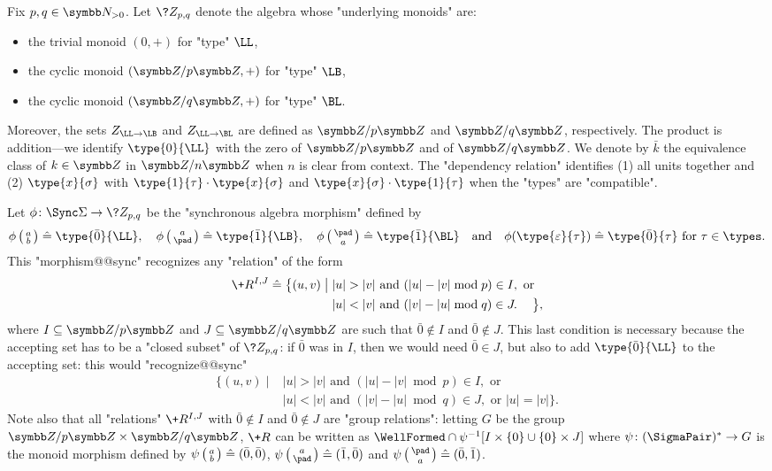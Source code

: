 \begin{example}
	\AP\label{ex:algebra-Zpq}
	Fix $p,q \in \N_{>0}$. Let $\?Z_{p,q}$ denote the algebra whose "underlying monoids" are:
	\begin{itemize}
		\item the trivial monoid $(0,+)$ for "type" $\LL$,
		\item the cyclic monoid $(\Z/p\Z,+)$ for "type" $\LB$,
		\item the cyclic monoid $(\Z/q\Z,+)$ for "type" $\BL$.
	\end{itemize}
	Moreover, the sets $Z_{\LL\to\LB}$ and $Z_{\LL\to\BL}$ are defined
	as $\Z/p\Z$ and $\Z/q\Z$, respectively.
	The product is addition---we identify $\type{0}{\LL}$ with the zero of $\Z/p\Z$ and
	of $\Z/q\Z$. We denote by $\bar k$ the equivalence class of $k\in \Z$ in
	$\Z/n\Z$ when $n$ is clear from context.
	The "dependency relation" identifies (1) all units together and (2) $\type{x}{\sigma}$ with $\type{1}{\tau} \cdot \type{x}{\sigma}$ and $\type{x}{\sigma} \cdot \type{1}{\tau}$ when the "types" are "compatible".
	
	Let $\phi\colon \Sync\Sigma \to \?Z_{p,q}$ be the "synchronous algebra morphism"
	defined by
	\[
		\phi \pair{a}{b} \defeq  \type{\bar 0}{\LL}, 
		\quad
		\phi \pair{a}{\pad} \defeq \type{\bar 1}{\LB},
		\quad
		\phi \pair{\pad}{a} \defeq \type{\bar 1}{\BL}
		\quad\text{and}\quad
		\phi(\type{\varepsilon}{\tau}) \defeq \type{\bar 0}{\tau}
		\text{ for $\tau \in \types$}.
	\]
	This "morphism@@sync" recognizes any "relation" of the form 
	\begin{align*}
		\+R^{I,J} \defeq \big\{
			(u,v) \;\big\vert\; & |u| > |v| \text{ and } (|u| - |v| \bmod{p}) \in I, \text{ or} \\
			& |u| < |v| \text{ and } (|v| - |u| \bmod{q}) \in J.
		\hphantom{\text{ or}}\big\},
	\end{align*}
	where $I \subseteq \Z/p\Z$ and $J \subseteq \Z/q\Z$ are such that $\bar 0 \not\in I$
	and $\bar 0 \not\in J$. This last condition is necessary because the accepting set
	has to be a "closed subset" of $\?Z_{p,q}$: if $\bar 0$ was in $I$, then we would need
	$\bar 0 \in J$, but also to add $\type{\bar 0}{\LL}$ to the accepting set: this would "recognize@@sync"
	\begin{align*}
		\big\{
			(u,v) \;\big\vert\; & |u| > |v| \text{ and } (|u| - |v| \bmod{p}) \in I, \text{ or} \\
			& |u| < |v| \text{ and } (|v| - |u| \bmod{q}) \in J, \text{ or } |u| = |v| \big\}.
	\end{align*}
	Note also that all "relations" $\+R^{I,J}$ with $\bar 0 \not\in I$
	and $\bar 0 \not\in J$ are "group relations": letting $G$ be the group $\Z/p\Z \times \Z/q\Z$,
	$\+R$ can be written as $\WellFormed\cap \psi^{-1}[I \times \{0\} \cup \{0\} \times J]$ where $\psi \colon (\SigmaPair)^* \to G$ is the monoid morphism defined by $\psi\pair{a}{b} \defeq 
	(\bar 0, \bar 0)$, $\psi\pair{a}{\pad} \defeq (\bar 1, \bar 0)$ and $\psi\pair{\pad}{a} \defeq
	(\bar 0, \bar 1)$.
\end{example}


